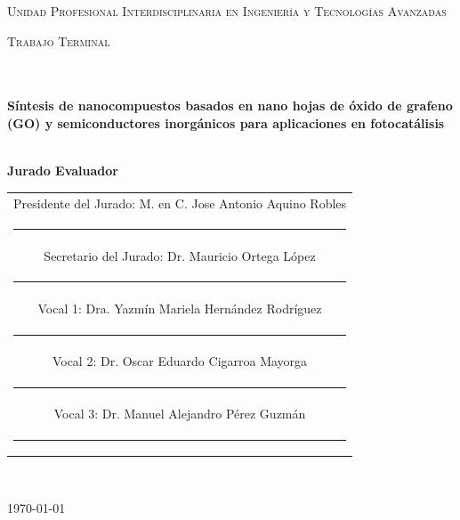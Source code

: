 \documentclass[12pt]{article}
\begin{document}
\begin{center}
\textsc{\LARGE Unidad Profesional Interdisciplinaria en Ingenier\'ia y				%
Tecnolog\'ias Avanzadas}\\[0.8cm]													%

\begin{minipage}{0.9\textwidth} 
\begin{center}																					%
\textsc{\LARGE Trabajo Terminal}
\end{center}
\end{minipage}\\[0.5cm]
    						
 			\vspace*{0.2cm}																		%
\HRule \\[0.4cm]																	%
{ \huge \bfseries Síntesis de nanocompuestos basados en nano hojas de óxido de grafeno (GO) y semiconductores inorgánicos para aplicaciones en fotocatálisis}\\[0.1cm]	%
\HRule \\[0.4cm]										

\begin{minipage}{\textwidth}
    \centering
    \textbf{Jurado Evaluador} \\[0.3cm]
    
    \begin{tabular}{c}
        Presidente del Jurado: M. en C. Jose Antonio Aquino Robles\\
        \rule{6cm}{0.4pt} \\[0.3cm]
        
        Secretario del Jurado: Dr. Mauricio Ortega López\\
        \rule{6cm}{0.4pt} \\[0.3cm]
        
        Vocal 1: Dra. Yazmín Mariela Hernández Rodríguez\\
        \rule{6cm}{0.4pt} \\[0.3cm]
        
        Vocal 2: Dr. Oscar Eduardo Cigarroa Mayorga\\
        \rule{6cm}{0.4pt} \\[0.3cm]
        
        Vocal 3: Dr. Manuel Alejandro Pérez Guzmán\\
        \rule{6cm}{0.4pt} \\[0.3cm]
    \end{tabular}
\end{minipage}

\vspace*{0.1cm}
 	
 		\\																		%
\vspace{0.1cm} 																				
\begin{center}																					
{\large \today}																	%
 			\end{center}												  						
\end{center}							 											
																					
\end{document}
